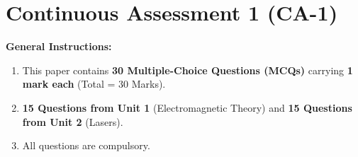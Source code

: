 \section{Continuous Assessment 1 (CA-1)}


\noindent
\textbf{General Instructions:}
\begin{enumerate}[topsep=2pt,itemsep=1pt]
    \item This paper contains \textbf{30 Multiple-Choice Questions (MCQs)} carrying \textbf{1 mark each} (Total = 30 Marks).
    \item \textbf{15 Questions from Unit 1} (Electromagnetic Theory) and \textbf{15 Questions from Unit 2} (Lasers).
    \item All questions are compulsory.
\end{enumerate}
\vspace{3mm}


